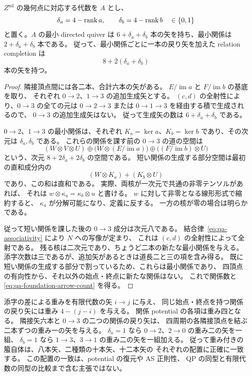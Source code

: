 \begin{proposition}[八・十・十二本の有限代数的判定]
\label{prop:qa-foundation-arrow-count}
\(Z^{\mathrm{nd}}\) の幾何点に対応する代数を \(A\) とし、
\[
 \delta_a=4-\operatorname{rank} a,\qquad \delta_b=4-\operatorname{rank} b
 \quad\in\{0,1\}
\]
と置く。\(A\) の最小 directed quiver は
\(6+\delta_a+\delta_b\) 本の矢を持ち、最小関係は
\(2+\delta_a+\delta_b\) 本である。
従って、最小関係ごとに一本の戻り矢を加えた relation completion は
\begin{equation}
 8+2(\delta_a+\delta_b)
 \label{eq:qa-foundation-arrow-count}
\end{equation}
本の矢を持つ。
\end{proposition}
\begin{proof}
隣接頂点間には各二本、合計六本の矢がある。
\(E/\operatorname{im}a\) と \(F/\operatorname{im}b\) の基底を取り、
それぞれ \(0\to2\)、\(1\to3\) の追加生成矢とする。
\((c,d)\) の全射性により、\(0\to3\) の全ての元は
\(0\to2\to3\) または \(0\to1\to3\) を経由する積で生成されるので、
\(0\to3\) の追加生成矢はない。
従って生成矢の数は \(6+\delta_a+\delta_b\) である。

\(0\to2\)、\(1\to3\) の最小関係は、それぞれ
\(K_a=\ker a\)、\(K_b=\ker b\) であり、その次元は
\(\delta_a,\delta_b\) である。
これらの関係を課す前の \(0\to3\) の道の空間は
\[
 (W\otimes V\otimes U)
 \oplus\bigl(W\otimes(E/\operatorname{im}a)\bigr)
 \oplus\bigl((F/\operatorname{im}b)\otimes U\bigr)
\]
という、次元 \(8+2\delta_a+2\delta_b\) の空間である。
短い関係の生成する部分空間は最初の直和成分内の
\[
 (W\otimes K_a)+(K_b\otimes U)
\]
であり、この和は直和である。
実際、両核が一次元で共通の非零テンソルがあれば、
それは \(w\otimes\kappa_a=\kappa_b\otimes u\) と書ける。
\(w\) に対して非零となる線形形式で縮約すると、
\(\kappa_a\) が分解可能になり、定義に反する。
一方の核が零の場合は明らかである。

従って短い関係を課した後の \(0\to3\) 成分は次元八である。
結合律~\eqref{eq:qa-associativity} により \(N\) への写像が定まり、
これは \((c,d)\) の全射性によって全射である。
残る核は二次元であり、ちょうど二本の新たな最小関係を与える。
添字次数は三であるが、追加矢があるときは道長二と三の項を含み得る。
既に短い関係の生成する部分で割っているため、これらは最小関係であり、
四頂点の有向性から、それ以外の始点・終点に新たな関係はない。
これで関係数と \eqref{eq:qa-foundation-arrow-count} を得る。
\end{proof}

添字の差による重みを有限代数の矢 \(i\to j\) に与え、
同じ始点・終点を持つ関係の戻り矢には重み \(4-(j-i)\) を与える。
関係 potential の各項は重み四となる。
隣接矢六本と \(0\to3\) の二つの関係の戻り矢は、
四周期の各隣接頂点を結ぶ二本ずつの重み一の矢を与える。
\(\delta_a=1\) なら \(0\to2\)、\(2\to0\) の重み二の矢を一組、
\(\delta_b=1\) なら \(1\to3\)、\(3\to1\) の重み二の矢を一組加える。
従って重み付きの箙自体は、八本矢、二種類の十本矢、十二本矢の
それぞれの配置に正確に一致する。
この配置の一致は、potential の復元や AS 正則性、
QP の同型と有限代数の同型の比較まで含む主張ではない。

